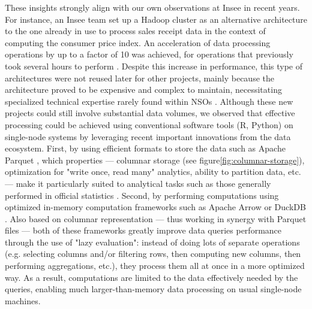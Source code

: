\documentclass[graybox]{svmult}
\begin{document}
These insights strongly align with our own observations at Insee in recent years. For instance, an Insee team set up a Hadoop cluster as an alternative architecture to the one already in use to process sales receipt data in the context of computing the consumer price index. An acceleration of data processing operations by up to a factor of 10 was achieved, for operations that previously took several hours to perform \cite{leclair2019utiliser}. Despite this increase in performance, this type of architectures were not reused later for other projects, mainly because the architecture proved to be expensive and complex to maintain, necessitating specialized technical expertise rarely found within NSOs \cite{vale2015international}. Although these new projects could still involve substantial data volumes, we observed that effective processing could be achieved using conventional software tools (R, Python) on single-node systems by leveraging recent important innovations from the data ecosystem. First, by using efficient formats to store the data such as Apache Parquet \cite{parquet2013}, which properties — columnar storage \cite{abadi2013design} (see figure\ref{fig:columnar-storage}), optimization for "write once, read many" analytics, ability to partition data, etc. — make it particularly suited to analytical tasks such as those generally performed in official statistics \cite{abdelaziz2023optimizing}. Second, by performing computations using optimized in-memory computation frameworks such as Apache Arrow \cite{arrow2016} or DuckDB \cite{raasveldt2019duckdb}. Also based on columnar representation — thus working in synergy with Parquet files — both of these frameworks greatly improve data queries performance through the use of "lazy evaluation": instead of doing lots of separate operations (e.g. selecting columns and/or filtering rows, then computing new columns, then performing aggregations, etc.), they process them all at once in a more optimized way. As a result, computations are limited to the data effectively needed by the queries, enabling much larger-than-memory data processing on usual single-node machines.
\end{document}

